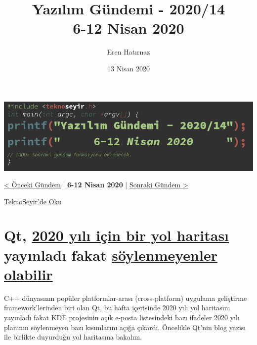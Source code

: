\documentclass[11pt]{article}
\author{Eren Hatırnaz}
\date{13 Nisan 2020}
\title{Yazılım Gündemi - 2020/14\\\medskip
\large 6-12 Nisan 2020}
\begin{document}
\maketitle
\tableofcontents \clearpage\shorthandoff{=}

\begin{center}
\includegraphics[width=.9\linewidth]{gorseller/yazilim-gundemi-banner.png}
\end{center}

\begin{center}
\href{../13/yazilim-gundemi-2020-13.pdf}{< Önceki Gündem} | \textbf{6-12 Nisan 2020} | \href{../15/yazilim-gundemi-2020-15.pdf}{Sonraki Gündem >}

\href{https://teknoseyir.com/blog/yazilim-gundemi-2020-14}{TeknoSeyir'de Oku}
\end{center}

\section{Qt, \href{https://www.qt.io/blog/qt-roadmap-for-2020}{2020 yılı için bir yol haritası} yayınladı fakat \href{https://www.phoronix.com/scan.php?page=news\_item\&px=Qt-Might-Restrict-New-Releases}{söylenmeyenler olabilir}}
\label{sec:org4ae9a49}
C++ dünyasının popüler platformlar-arası (cross-platform) uygulama geliştirme
framework'lerinden biri olan Qt, bu hafta içerisinde 2020 yılı yol haritasını
yayınladı fakat KDE projesinin açık e-posta listesindeki bazı ifadeler 2020
yılı planının söylenmeyen bazı kısımlarını açığa çıkardı. Öncelikle Qt'nin
blog yazısı ile birlikte duyurduğu yol haritasına bakalım.
\end{document}
